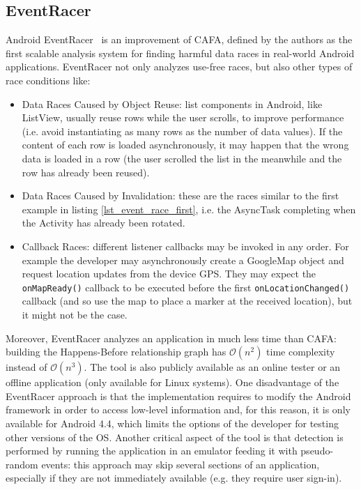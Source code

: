 \documentclass[11pt,a4paper,notitlepage]{article}
\begin{document}
\subsection{EventRacer}
Android EventRacer~\cite{Bielik:2015:SRD:2858965.2814303} is an improvement of CAFA, defined by the authors as the first scalable analysis system for finding harmful data races in real-world Android applications. EventRacer not only analyzes use-free races, but also other types of race conditions like:
\begin{itemize}
	\item Data Races Caused by Object Reuse: list components in Android, like ListView, usually reuse rows while the user scrolls, to improve performance (i.e. avoid instantiating as many rows as the number of data values). If the content of each row is loaded asynchronously, it may happen that the wrong data is loaded in a row (the user scrolled the list in the meanwhile and the row has already been reused).
	\item Data Races Caused by Invalidation: these are the races similar to the first example in listing \ref{lst_event_race_first}, i.e. the AsyncTask completing when the Activity has already been rotated.
	\item Callback Races: different listener callbacks may be invoked in any order. For example the developer may asynchronously create a GoogleMap object and request location updates from the device GPS. They may expect the \texttt{onMapReady()} callback to be executed before the first \texttt{onLocationChanged()} callback (and so use the map to place a marker at the received location), but it might not be the case.
\end{itemize}
Moreover, EventRacer analyzes an application in much less time than CAFA: building the Happens-Before relationship graph has $\mathcal{O}(n^2)$ time complexity instead of $\mathcal{O}(n^3)$. The tool is also publicly available as an online tester or an offline application (only available for Linux systems). One disadvantage of the EventRacer approach is that the implementation requires to modify the Android framework in order to access low-level information and, for this reason, it is only available for Android 4.4, which limits the options of the developer for testing other versions of the OS. Another critical aspect of the tool is that detection is performed by running the application in an emulator feeding it with pseudo-random events: this approach may skip several sections of an application, especially if they are not immediately available (e.g. they require user sign-in).
\end{document}
